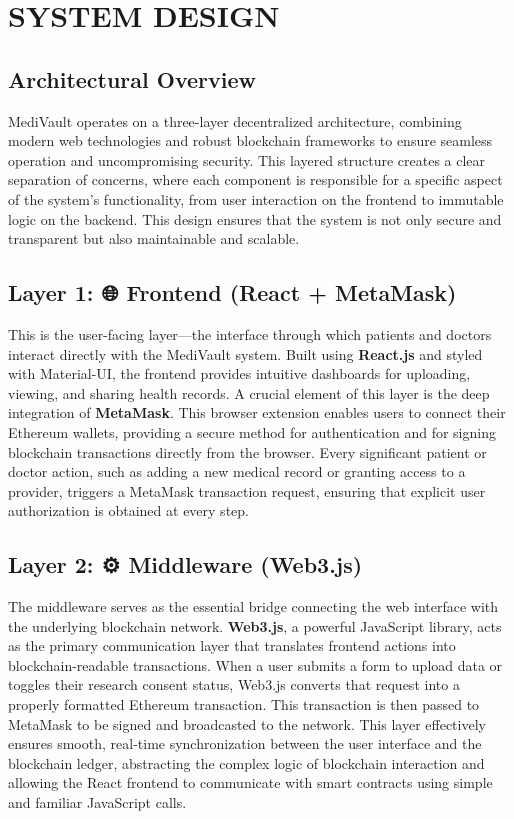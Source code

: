 \chapter{SYSTEM DESIGN}
\label{chap:system_design}

\section{Architectural Overview}
MediVault operates on a three-layer decentralized architecture, combining modern web technologies and robust blockchain frameworks to ensure seamless operation and uncompromising security. This layered structure creates a clear separation of concerns, where each component is responsible for a specific aspect of the system's functionality, from user interaction on the frontend to immutable logic on the backend. This design ensures that the system is not only secure and transparent but also maintainable and scalable.

\section{Layer 1: 🌐 Frontend (React + MetaMask)}
This is the user-facing layer—the interface through which patients and doctors interact directly with the MediVault system. Built using \textbf{React.js} and styled with Material-UI, the frontend provides intuitive dashboards for uploading, viewing, and sharing health records. A crucial element of this layer is the deep integration of \textbf{MetaMask}. This browser extension enables users to connect their Ethereum wallets, providing a secure method for authentication and for signing blockchain transactions directly from the browser. Every significant patient or doctor action, such as adding a new medical record or granting access to a provider, triggers a MetaMask transaction request, ensuring that explicit user authorization is obtained at every step.

\section{Layer 2: ⚙️ Middleware (Web3.js)}
The middleware serves as the essential bridge connecting the web interface with the underlying blockchain network. \textbf{Web3.js}, a powerful JavaScript library, acts as the primary communication layer that translates frontend actions into blockchain-readable transactions. When a user submits a form to upload data or toggles their research consent status, Web3.js converts that request into a properly formatted Ethereum transaction. This transaction is then passed to MetaMask to be signed and broadcasted to the network. This layer effectively ensures smooth, real-time synchronization between the user interface and the blockchain ledger, abstracting the complex logic of blockchain interaction and allowing the React frontend to communicate with smart contracts using simple and familiar JavaScript calls.

